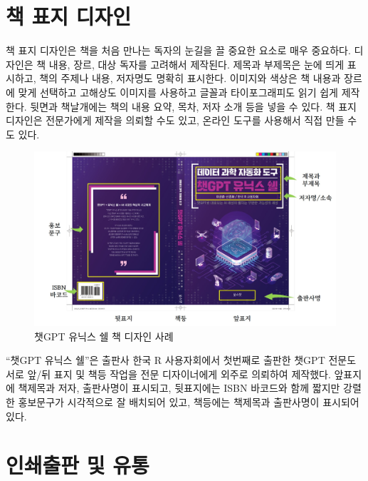 \documentclass[
  letterpaper,
]{book}
\begin{document}
\hypertarget{uxcc45-uxd45cuxc9c0-uxb514uxc790uxc778}{%
\section{책 표지 디자인}\label{uxcc45-uxd45cuxc9c0-uxb514uxc790uxc778}}

책 표지 디자인은 책을 처음 만나는 독자의 눈길을 끌 중요한 요소로 매우
중요하다. 디자인은 책 내용, 장르, 대상 독자를 고려해서 제작된다. 제목과
부제목은 눈에 띄게 표시하고, 책의 주제나 내용, 저자명도 명확히 표시한다.
이미지와 색상은 책 내용과 장르에 맞게 선택하고 고해상도 이미지를
사용하고 글꼴과 타이포그래피도 읽기 쉽게 제작한다. 뒷면과 책날개에는
책의 내용 요약, 목차, 저자 소개 등을 넣을 수 있다. 책 표지 디자인은
전문가에게 제작을 의뢰할 수도 있고, 온라인 도구를 사용해서 직접 만들
수도 있다.

\begin{figure}

{\centering \includegraphics{images/publish_book_design.jpg}

}

\caption{챗GPT 유닉스 쉘 책 디자인 사례}

\end{figure}

``챗GPT 유닉스 쉘''은 출판사 한국 R 사용자회에서 첫번째로 출판한 챗GPT
전문도서로 앞/뒤 표지 및 책등 작업을 전문 디자이너에게 외주로 의뢰하여
제작했다. 앞표지에 책제목과 저자, 출판사명이 표시되고, 뒷표지에는 ISBN
바코드와 함께 짧지만 강렬한 홍보문구가 시각적으로 잘 배치되어 있고,
책등에는 책제목과 출판사명이 표시되어 있다.

\hypertarget{uxc778uxc1c4uxcd9cuxd310-uxbc0f-uxc720uxd1b5}{%
\section{인쇄출판 및
유통}\label{uxc778uxc1c4uxcd9cuxd310-uxbc0f-uxc720uxd1b5}}
\end{document}
